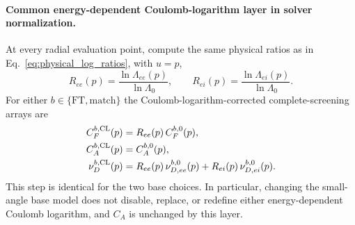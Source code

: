 \documentclass[11pt]{article}
\begin{document}
\paragraph{Common energy-dependent Coulomb-logarithm layer in solver normalization.}
At every radial evaluation point, compute the same physical ratios as in
Eq.~\eqref{eq:physical_log_ratios}, with $u=p$,
\begin{equation}
 R_{ee}(p)=\frac{\ln\Lambda_{ee}(p)}{\ln\Lambda_0},
 \qquad
 R_{ei}(p)=\frac{\ln\Lambda_{ei}(p)}{\ln\Lambda_0}.
 \label{eq:numeric_log_ratios}
\end{equation}
For either $b\in\{\mathrm{FT},\mathrm{match}\}$ the Coulomb-logarithm-corrected
complete-screening arrays are
\begin{align}
 C_F^{b,\rm CL}(p)
 &=R_{ee}(p)\,C_F^{b,0}(p),
 \label{eq:common_log_numeric_cf}\\
 C_A^{b,\rm CL}(p)
 &=C_A^{b,0}(p),
 \label{eq:common_log_numeric_ca}\\
 \nu_D^{b,\rm CL}(p)
 &=R_{ee}(p)\,\nu_{D,ee}^{b,0}(p)
  +R_{ei}(p)\,\nu_{D,ei}^{b,0}(p).
 \label{eq:common_log_numeric_nud}
\end{align}
This step is identical for the two base choices.  In particular, changing the small-angle
base model does not disable, replace, or redefine either energy-dependent Coulomb
logarithm, and $C_A$ is unchanged by this layer.
\end{document}

